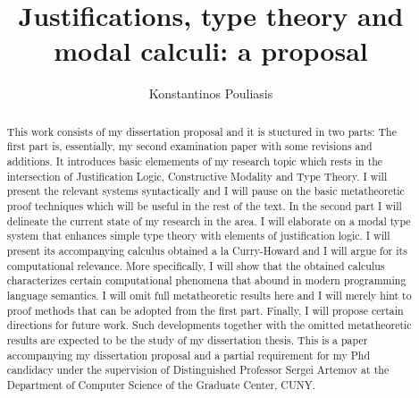 \documentclass[12pt]{report}
\title{Justifications, type theory and modal calculi: a proposal}
\author{Konstantinos Pouliasis}
\begin{document}
\maketitle


\begin{abstract}
This work consists of my dissertation proposal and  it is stuctured in two parts: 
The first part is, essentially, my second examination paper with some revisions and additions. It  introduces basic elemements of my research topic which rests in 
the intersection of Justification Logic, Constructive Modality and Type Theory. I will present the relevant systems syntactically and I will pause on the basic metatheoretic
proof techniques which will be useful in the rest of the text.
In the second part I will delineate the current state of my research in the area.
I will elaborate on a modal type system that enhances simple type theory with elements of justification logic. I will present its accompanying calculus 
 obtained  a la Curry-Howard and I will argue for its computational relevance. More specifically, I will show  
that the obtained calculus characterizes  certain computational phenomena that abound in modern programming language semantics. 
I will omit full metatheoretic
results here and  I will merely hint to  proof methods that can be adopted from the first part. Finally,  I will propose certain
directions for future work. Such developments together with the omitted metatheoretic results are expected to be the study of my dissertation thesis.
This is a  paper accompanying my dissertation proposal and a partial requirement  for my Phd candidacy under the supervision of Distinguished Professor Sergei Artemov at the Department of Computer Science of the Graduate Center, CUNY.
\end{abstract}
\tableofcontents










\nocite{Pfenning2009a, Pfenning2009b}




\end{document}
